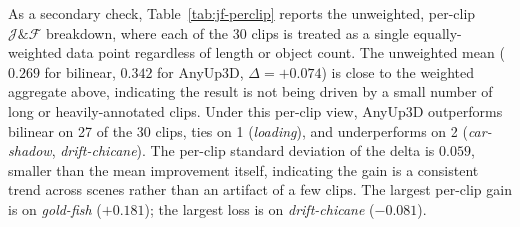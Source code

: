 As a secondary check, Table~\ref{tab:jf-perclip} reports the unweighted, per-clip $\mathcal{J}\&\mathcal{F}$ breakdown, where each of the 30 clips is treated as a single equally-weighted data point regardless of length or object count.
The unweighted mean ($0.269$ for bilinear, $0.342$ for AnyUp3D, $\Delta = +0.074$) is close to the weighted aggregate above, indicating the result is not being driven by a small number of long or heavily-annotated clips.
Under this per-clip view, AnyUp3D outperforms bilinear on 27 of the 30 clips, ties on 1 (\textit{loading}), and underperforms on 2 (\textit{car-shadow}, \textit{drift-chicane}).
The per-clip standard deviation of the delta is $0.059$, smaller than the mean improvement itself, indicating the gain is a consistent trend across scenes rather than an artifact of a few clips.
The largest per-clip gain is on \textit{gold-fish} ($+0.181$); the largest loss is on \textit{drift-chicane} ($-0.081$).

